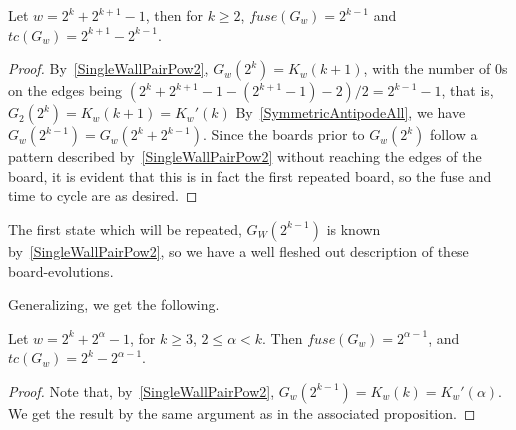 \documentclass[12pt,letterpaper]{article}
\begin{document}
\begin{prop}\label{BetweenPows2}
  Let $w=2^k+2^{k+1}-1$, then for $k\geq 2$, $fuse(G_w)=2^{k-1}$ and $tc(G_w)=2^{k+1}-2^{k-1}$.
\end{prop}
\begin{proof}
  By~\cref{SingleWallPairPow2}, %
  $G_w(2^k)=K_w(k+1)$, with the number of 0s on the edges being $(2^k+2^{k+1}-1-(2^{k+1}-1)-2)/2=2^{k-1}-1$, that is, $G_2(2^k)=K_w(k+1)=K_w'(k)$ By~\cref{SymmetricAntipodeAll}, we have $G_w(2^{k-1})=G_w(2^k+2^{k-1})$. Since the boards prior to $G_w(2^k)$ follow a pattern described by~\cref{SingleWallPairPow2} without reaching the edges of the board, it is evident that this is in fact the first repeated board, so the fuse and time to cycle are as desired. 
\end{proof}
\begin{remark}
  The first state which will be repeated, $G_W(2^{k-1})$ is known by~\cref{SingleWallPairPow2}, so we have a well fleshed out description of these board-evolutions.
\end{remark}
Generalizing, we get the following.
\begin{cor}
  Let $w=2^k+2^\alpha-1$, for $k\geq 3$, $2\leq \alpha<k$. Then $fuse(G_w)=2^{\alpha-1}$, and $tc(G_w)=2^k-2^{\alpha-1}$.
\end{cor}
\begin{proof}
  Note that, by~\cref{SingleWallPairPow2}, $G_w(2^{k-1})=K_w(k)=K_w'(\alpha)$. We get the result by the same argument as in the associated proposition.
\end{proof}
\end{document}
